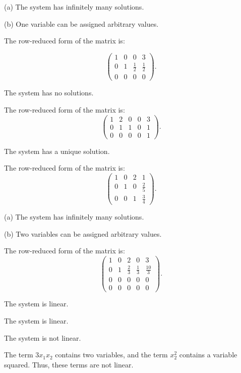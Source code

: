 \ans (a) The system has infinitely many solutions.

(b) One variable can be assigned arbitrary values.

\soln The row-reduced form of the matrix is:

\[
\left(\begin{array}{rrr|r} 1 & 0 & 0 & 3 \\ 0 & 1 &
\frac{1}{2} & \frac{1}{2} \\ 0 & 0 & 0 & 0\end{array}\right).
\]

\ans The system has no solutions.

\soln The row-reduced form of the matrix is:
\[
\left(\begin{array}{rrrr|r} 1 & 2 & 0 & 0 & 3 \\
0 & 1 & 1 & 0 & 1 \\ 0 & 0 & 0 & 0 & 1\end{array}\right).
\]

\ans The system has a unique solution.

\soln The row-reduced form of the matrix is:
\[
\left(\begin{array}{rrr|r} 1 & 0 & 2 & 1 \\ 0 & 1 & 0 & \frac{2}{5}
\\ 0 & 0 & 1 & \frac{3}{4}\end{array}\right).
\]

\ans (a) The system has infinitely many solutions.

(b) Two variables can be assigned arbitrary values.

\soln The row-reduced form of the matrix is:
\[
\left(\begin{array}{rrrr|r} 1 & 0 & 2 & 0 & 3 \\ 0 & 1 & \frac{2}{3}
& \frac{1}{3} & \frac{10}{3} \\ 0 & 0 & 0 & 0 & 0 \\ 0 & 0 & 0 & 0 & 0
\end{array}\right).
\]

\newpage
{} \ans The system is linear.

 \ans The system is linear.

 \ans The system is not linear.

\soln The term $3x_1x_2$ contains two variables, and the term $x_2^2$
contains a variable squared.  Thus, these terms are not linear.

